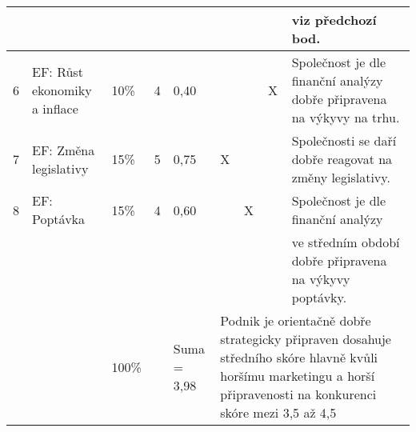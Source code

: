 \begin{table}[]
\begin{tabular}{|l|l|l|l|l|llll|}
 &  &  &  &  & \multicolumn{1}{l|}{} & \multicolumn{1}{l|}{} & \multicolumn{1}{l|}{} & viz předchozí bod. \\ \hline
6 & EF: Růst ekonomiky a inflace & 10\% & 4 & 0,40 & \multicolumn{1}{l|}{} & \multicolumn{1}{l|}{} & \multicolumn{1}{l|}{X} & Společnost je dle finanční analýzy dobře připravena na výkyvy na trhu. \\ \hline
7 & EF: Změna legislativy & 15\% & 5 & 0,75 & \multicolumn{1}{l|}{X} & \multicolumn{1}{l|}{} & \multicolumn{1}{l|}{} & Společnosti se daří dobře reagovat na změny legislativy. \\ \hline
8 & EF: Poptávka & 15\% & 4 & 0,60 & \multicolumn{1}{l|}{} & \multicolumn{1}{l|}{X} & \multicolumn{1}{l|}{} & Společnost je dle finanční analýzy \\
 &  &  &  &  & \multicolumn{1}{l|}{} & \multicolumn{1}{l|}{} & \multicolumn{1}{l|}{} & ve středním období dobře připravena na výkyvy poptávky. \\ \hline
\cellcolor[HTML]{C0C0C0} & \cellcolor[HTML]{C0C0C0} & 100\% & \cellcolor[HTML]{C0C0C0} & Suma = 3,98 & \multicolumn{4}{l|}{Podnik je orientačně dobře strategicky připraven dosahuje středního skóre hlavně kvůli horšímu marketingu a horší připravenosti na konkurenci skóre mezi 3,5 až 4,5} \\ \hline
\end{tabular}
\end{table}